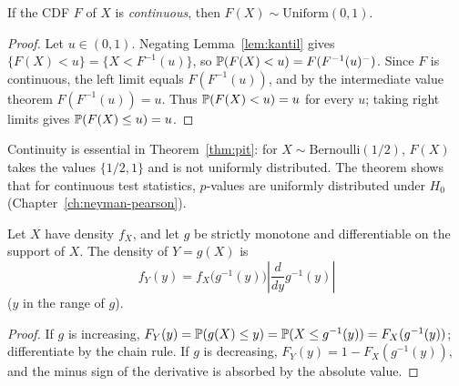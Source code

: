 \documentclass[main.tex]{subfiles}
\begin{document}
\begin{theorem}\label{thm:pit}
If the CDF $F$ of $X$ is \emph{continuous}, then $F(X)\sim\text{Uniform}(0,1)$.
\end{theorem}
\begin{proof}
Let $u\in(0,1)$. Negating Lemma~\ref{lem:kantil} gives $\{F(X)<u\}=\{X<F^{-1}(u)\}$, so $\P(F(X)<u)=F(F^{-1}(u)^-)$. Since $F$ is continuous, the left limit equals $F(F^{-1}(u))$, and by the intermediate value theorem $F(F^{-1}(u))=u$. Thus $\P(F(X)<u)=u$ for every $u$; taking right limits gives $\P(F(X)\le u)=u$.
\end{proof}

\begin{remark}
Continuity is essential in Theorem~\ref{thm:pit}: for $X\sim\text{Bernoulli}(1/2)$, $F(X)$ takes the values $\{1/2,1\}$ and is not uniformly distributed. The theorem shows that for continuous test statistics, $p$-values are uniformly distributed under $H_0$ (Chapter~\ref{ch:neyman-pearson}).
\end{remark}

\begin{theorem}\label{thm:donusum}
Let $X$ have density $f_X$, and let $g$ be strictly monotone and differentiable on the support of $X$. The density of $Y=g(X)$ is
\[
f_Y(y)=f_X\big(g^{-1}(y)\big)\left|\frac{d}{dy}g^{-1}(y)\right|
\]
($y$ in the range of $g$).
\end{theorem}
\begin{proof}
If $g$ is increasing, $F_Y(y)=\P(g(X)\le y)=\P(X\le g^{-1}(y))=F_X(g^{-1}(y))$; differentiate by the chain rule. If $g$ is decreasing, $F_Y(y)=1-F_X(g^{-1}(y))$, and the minus sign of the derivative is absorbed by the absolute value.
\end{proof}
\end{document}
